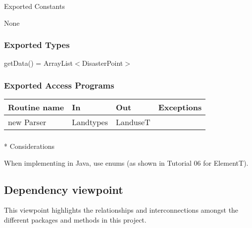 \documentclass[12pt]{article}
\begin{document}
                \subsubsection*{} {Exported Constants}
                
                None
                
                \subsubsection* {Exported Types}
                
                getData() = ArrayList$<$DisasterPoint$>$
                
                \subsubsection* {Exported Access Programs}
                
                
                \begin{tabular}{| l | l | l | p{5cm} |}
                \hline
                \textbf{Routine name} & \textbf{In} & \textbf{Out} & \textbf{Exceptions}\\
                \hline
                new Parser & Landtypes & LanduseT & ~\\
                \hline
                \end{tabular}
                
                \subsubsection{}* {Considerations}
                
                When implementing in Java, use enums (as shown in Tutorial 06 for ElementT).
                            
        \subsection{Dependency viewpoint}%
            This viewpoint highlights the relationships and interconnections amongst the different packages and methods in this project.
            
\end{document}

